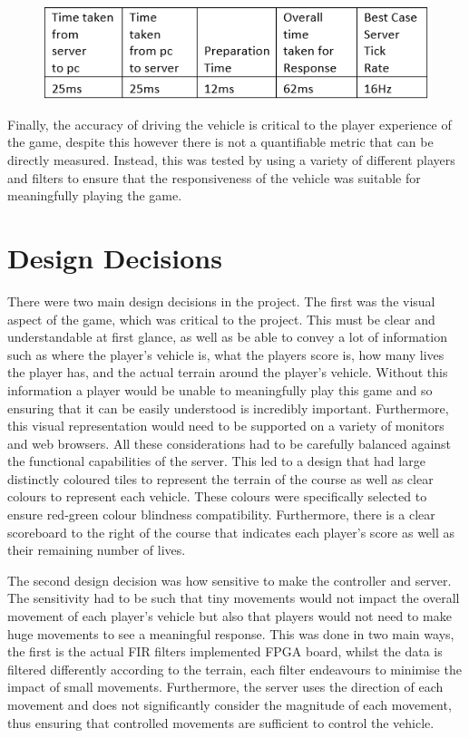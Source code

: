 \documentclass[12pt,a4paper]{article}
\begin{document}
 \begin{figure} [h!]
    \centering
    \includegraphics[scale = 0.75]{Tick.png}
 \end{figure}
 \par
 {\scriptsize Finally, the accuracy of driving the vehicle is critical to the player experience 
 of the game, despite this however there is not a quantifiable metric that can be 
 directly measured. Instead, this was tested by using a variety of different players 
 and filters to ensure that the responsiveness of the vehicle was suitable for 
 meaningfully playing the game.}

\section{\normalsize Design Decisions}

{\scriptsize There were two main design decisions in the project. The first was the visual aspect 
of the game, which was critical to the project. This must be clear and understandable 
at first glance, as well as be able to convey a lot of information such as where the 
player’s vehicle is, what the players score is, how many lives the player has, and 
the actual terrain around the player’s vehicle. Without this information a player 
would be unable to meaningfully play this game and so ensuring that it can be easily 
understood is incredibly important. Furthermore, this visual representation would 
need to be supported on a variety of monitors and web browsers. All these 
considerations had to be carefully balanced against the functional capabilities 
of the server. This led to a design that had large distinctly coloured tiles to 
represent the terrain of the course as well as clear colours to represent each 
vehicle. These colours were specifically selected to ensure red-green colour 
blindness compatibility.  Furthermore, there is a clear scoreboard to the right of 
the course that indicates each player's score as well as their remaining number of lives.
\par
The second design decision was how sensitive to make the controller and server. The 
sensitivity had to be such that tiny movements would not impact the overall movement 
of each player’s vehicle but also that players would not need to make huge movements 
to see a meaningful response. This was done in two main ways, the first is the actual 
FIR filters implemented FPGA board, whilst the data is filtered differently according 
to the terrain, each filter endeavours to minimise the impact of small movements. 
Furthermore, the server uses the direction of each movement and does not significantly 
consider the magnitude of each movement, thus ensuring that controlled movements are 
sufficient to control the vehicle. }
\end{document}
